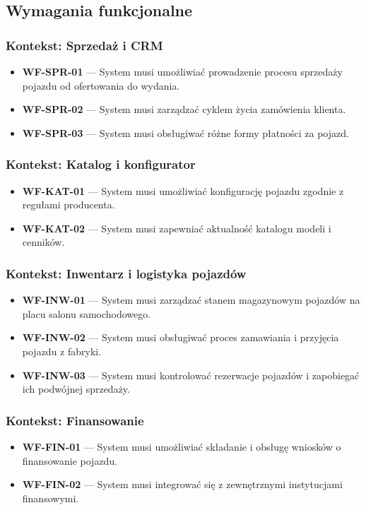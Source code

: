 \subsection{Wymagania funkcjonalne}

\subsubsection{Kontekst: Sprzedaż i CRM}
\begin{itemize}
    \item \textbf{WF-SPR-01} --- System musi umożliwiać prowadzenie procesu sprzedaży pojazdu od ofertowania do wydania.
    \item \textbf{WF-SPR-02} --- System musi zarządzać cyklem życia zamówienia klienta.
    \item \textbf{WF-SPR-03} --- System musi obsługiwać różne formy płatności za pojazd.
\end{itemize}

\subsubsection{Kontekst: Katalog i konfigurator}
\begin{itemize}
    \item \textbf{WF-KAT-01} --- System musi umożliwiać konfigurację pojazdu zgodnie z regułami producenta.
    \item \textbf{WF-KAT-02} --- System musi zapewniać aktualność katalogu modeli i cenników.
\end{itemize}

\subsubsection{Kontekst: Inwentarz i logistyka pojazdów}
\begin{itemize}
    \item \textbf{WF-INW-01} --- System musi zarządzać stanem magazynowym pojazdów na placu salonu samochodowego.
    \item \textbf{WF-INW-02} --- System musi obsługiwać proces zamawiania i przyjęcia pojazdu z fabryki.
    \item \textbf{WF-INW-03} --- System musi kontrolować rezerwacje pojazdów i zapobiegać ich podwójnej sprzedaży.
\end{itemize}

\subsubsection{Kontekst: Finansowanie}
\begin{itemize}
    \item \textbf{WF-FIN-01} --- System musi umożliwiać składanie i obsługę wniosków o finansowanie pojazdu.
    \item \textbf{WF-FIN-02} --- System musi integrować się z zewnętrznymi instytucjami finansowymi.
\end{itemize}

